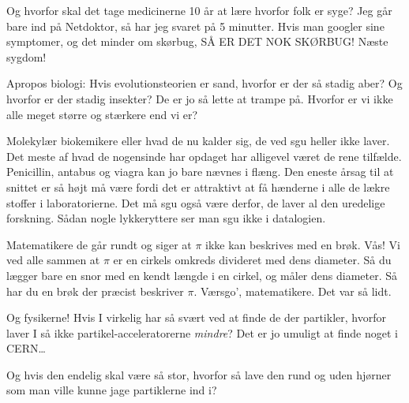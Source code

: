 \documentclass[a4paper,11pt]{article}
\begin{document}
\begin{sketch}
 Og hvorfor skal det tage medicinerne 10 år at lære hvorfor
folk er syge?  Jeg går bare ind på Netdoktor, så har jeg svaret på 5
minutter. Hvis man googler sine symptomer, og det minder om skørbug,
SÅ ER DET NOK SKØRBUG!  Næste sygdom!

 Apropos biologi: Hvis evolutionsteorien er sand, hvorfor er der så
stadig aber?  Og hvorfor er der stadig insekter? De er jo så lette at
trampe på. Hvorfor er vi ikke alle meget større og stærkere end vi er?

 Molekylær biokemikere eller hvad de nu kalder sig, de ved sgu heller ikke laver. Det meste af hvad de nogensinde har opdaget har alligevel været de rene tilfælde. Penicillin, antabus og viagra kan jo bare nævnes i flæng. Den eneste årsag til at snittet er så højt må være fordi det er attraktivt at få hænderne i alle de lækre stoffer i laboratorierne. Det må sgu også være derfor, de laver al den uredelige forskning. Sådan nogle lykkeryttere ser man sgu ikke i datalogien.

\begin{comment}
\says{A} Rollespillere er kendt for at være meget overtroiske, men der
er faktisk noget om snakken: Vi ved jo alle at en terning gennem sit
liv vil slå et bestemt antal 6'ere, så hvis man slår en 6'er med den,
vil den derfor have én færre sekser tilbage, og derved er terningens
kvalitet blevet reduceret.  Ja, selv noget så simpel, er det tydeligt,
at matematikerne er for dumme til at forstå.
\end{comment}

 Matematikere de går rundt og siger at $\pi$ ikke kan beskrives med en
brøk. Vås! Vi ved alle sammen at $\pi$ er en cirkels omkreds divideret
med dens diameter. Så du lægger bare en snor med en kendt længde i en
cirkel, og måler dens diameter. Så har du en brøk der præcist
beskriver $\pi$. Værsgo', matematikere. Det var så lidt.


  Og fysikerne! Hvis I virkelig
har så svært ved at finde de der partikler, hvorfor laver I så ikke
partikel-acceleratorerne \textit{mindre}? Det er jo umuligt at finde
noget i CERN\ldots

 Og hvis den endelig skal være så stor, hvorfor så lave den
rund og uden hjørner som man ville kunne jage partiklerne ind i?

\begin{comment}
\says{A} Fysikerne påstår endvidere, at mængden af energi i universet
er konstant. \act{Suk.} 0) Sæt en lille vandmølle på vandhanen, 1)
Tænd for vandhanen, 2) uendelig energi!  Fysikerne påstår også at
varme er energi, men jeg tænder for en lighter eller skruer op for min
radiator, så bliver der varmere. Ergo har jeg igen tilføjet energi til
universet!
\end{comment}


\end{sketch}
\end{document}
